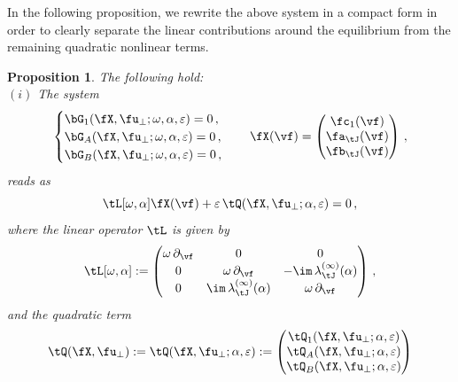 \documentclass[a4paper,reqno,10pt]{article}
\newtheorem{pro}{Proposition}[section]
\newcommand{\pa}{\partial}
\begin{document}
 In the following proposition, we rewrite the above system in a compact form in order to clearly separate the linear contributions around the equilibrium from the remaining quadratic nonlinear terms.
 \begin{pro}\label{prop.compact.bifurc}
The following hold:
\\[1mm]
\noindent $(i)$	The system
 	\begin{equation}\label{fX.def}
 			\begin{cases}
 			\bG_{1}(\fX,\fu_{\perp};\omega,\alpha,\varepsilon) = 0\,, \\
 			\bG_{A}(\fX,\fu_{\perp};\omega,\alpha,\varepsilon) = 0\,, \\ 
 			\bG_{B}(\fX,\fu_{\perp};\omega,\alpha,\varepsilon) = 0\,,
 		\end{cases} 
 		 \quad \fX(\vf)= \begin{pmatrix}
 		\fc_{1}(\vf) \\ \fa_{\tJ}(\vf) \\ \fb_{\tJ}(\vf)
 		\end{pmatrix} \,,
 	\end{equation}
 	reads as
 	\begin{equation}\label{compact.eq.1J}
 		\tL[\omega,\alpha] \fX(\vf)+ \varepsilon\, \tQ(\fX,\fu_{\perp};\alpha,\varepsilon) = 0 \,,
 	\end{equation}
 	where
 	the linear operator $\tL$ is given by
 	\begin{equation}\label{linear.tang.matrix}
 		\tL[\omega,\alpha] := \begin{pmatrix}
 			\omega\,\pa_{\vf} & 0 & 0 \\
 			0 & \omega\,\pa_{\vf} & -\im\,\lambda_{\tJ}^{(\infty)}(\alpha) \\
 			0 & \im\,\lambda_{\tJ}^{(\infty)}(\alpha) & \omega\,\pa_{\vf}
 		\end{pmatrix}\,,
 	\end{equation}
 	and the quadratic term
 		\begin{equation}\label{tQ.def}
 		\tQ(\fX,\fu_{\perp}):= \tQ(\fX,\fu_{\perp};\alpha,\varepsilon) := \begin{pmatrix}
 			\tQ_{1}(\fX,\fu_{\perp};\alpha,\varepsilon)  \\ 
 			\tQ_{A}(\fX,\fu_{\perp};\alpha,\varepsilon)  \\ 
 			\tQ_{B}(\fX,\fu_{\perp};\alpha,\varepsilon ) \\ 
 		\end{pmatrix}
 	\end{equation}

\end{pro}
\end{document}
